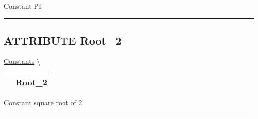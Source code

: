 \par
Constant PI


\rule{\linewidth}{0.5pt}
\subsection*{\textsf{\colorbox{headtoc}{\color{white} ATTRIBUTE}
Root\_2}}

\hypertarget{ecldoc:ml_core.constants.root_2}{}
\hspace{0pt} \hyperlink{ecldoc:ML_Core.Constants}{Constants} \textbackslash 

{\renewcommand{\arraystretch}{1.5}
\begin{tabularx}{\textwidth}{|>{\raggedright\arraybackslash}l|X|}
\hline
\hspace{0pt}\mytexttt{\color{red} } & \textbf{Root\_2} \\
\hline
\end{tabularx}
}

\par
Constant square root of 2


\rule{\linewidth}{0.5pt}


